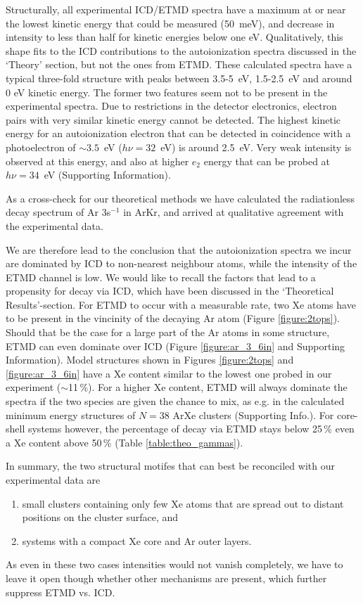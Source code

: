 Structurally, all experimental ICD/ETMD spectra have a maximum at or near the lowest kinetic energy that could be measured (50~meV), and decrease in intensity to less than half for kinetic energies below one eV. 
Qualitatively, this shape fits to the ICD contributions to the autoionization spectra discussed in the `Theory' section, but not the ones from ETMD. These calculated spectra have a typical three-fold structure with peaks between 3.5-5~eV, 1.5-2.5~eV and around 0 eV kinetic energy. 
The former two features seem not to be present in the experimental spectra. 
Due to restrictions in the detector electronics, electron pairs with very similar kinetic energy cannot be detected. 
The highest kinetic energy for an autoionization electron that can be detected in coincidence with a photoelectron of $\sim3.5$~eV ($h\nu = 32$~eV) is around 2.5~eV.
Very weak intensity is observed at this energy, and also at higher $e_2$ energy that can be probed at $h\nu = 34$~eV (Supporting Information).

As a cross-check for our theoretical methods we have calculated the radiationless decay spectrum of Ar 3s$^{-1}$ in ArKr, and arrived at qualitative agreement with the experimental data.\cite{arkr}

We are therefore lead to the conclusion that the autoionization spectra we incur are dominated by ICD to non-nearest neighbour atoms, while the intensity of the ETMD channel is low. 
We would like to recall the factors that lead to a propensity for decay via ICD, which have been discussed in the `Theoretical Results'-section.
For ETMD to occur with a measurable rate, two Xe atoms have to be present in the vincinity of the decaying Ar atom (Figure \ref{figure:2tops}).
Should that be the case for a large part of the Ar atoms in some structure, ETMD can even dominate over ICD (Figure \ref{figure:ar_3_6in} and Supporting Information).
Model structures shown in Figures \ref{figure:2tops} and \ref{figure:ar_3_6in} have a Xe content similar to the lowest one probed in our experiment ($\sim$11\,\%).
For a higher Xe content, ETMD will always dominate the spectra if the two species are given the chance to mix, as e.g. in the calculated minimum energy structures of $N=38$ ArXe clusters (Supporting Info.).
For core-shell systems however, the percentage of decay via ETMD stays below 25\,\% even a Xe content above 50\,\% (Table \ref{table:theo_gammas}).

In summary, the two structural motifes that can best be reconciled with our experimental data are
\begin{enumerate}
	\item small clusters containing only few Xe atoms that are spread out to distant positions on the cluster surface, and
	\item systems with a compact Xe core and Ar outer layers.
\end{enumerate}
As even in these two cases intensities would not vanish completely, we have to leave it open though whether other mechanisms are present, which further suppress ETMD vs. ICD.
